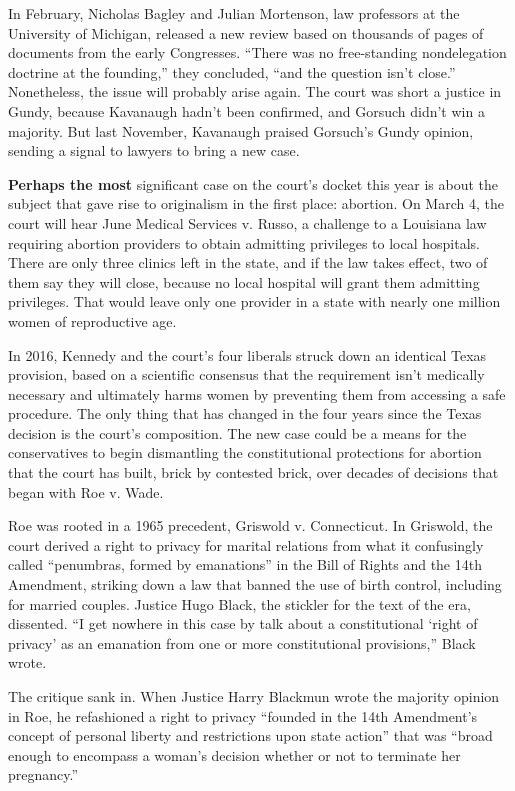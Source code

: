 In February, Nicholas Bagley and Julian Mortenson, law professors at the
University of Michigan, released a new review based on thousands of
pages of documents from the early Congresses. ``There was no
free-standing non­delegation doctrine at the founding,'' they concluded,
``and the question isn't close.'' Nonetheless, the issue will probably
arise again. The court was short a justice in Gundy, because Kavanaugh
hadn't been confirmed, and Gorsuch didn't win a majority. But last
November, Kavanaugh praised Gorsuch's Gundy opinion, sending a signal to
lawyers to bring a new case.

\textbf{Perhaps the most} significant case on the court's docket this
year is about the subject that gave rise to originalism in the first
place: abortion. On March 4, the court will hear June Medical Services
v. Russo, a challenge to a Louisiana law requiring abortion providers to
obtain admitting privileges to local hospitals. There are only three
clinics left in the state, and if the law takes effect, two of them say
they will close, because no local hospital will grant them admitting
privileges. That would leave only one provider in a state with nearly
one million women of reproductive age.

In 2016, Kennedy and the court's four liberals struck down an identical
Texas provision, based on a scientific consensus that the requirement
isn't medically necessary and ultimately harms women by preventing them
from accessing a safe procedure. The only thing that has changed in the
four years since the Texas decision is the court's composition. The new
case could be a means for the conservatives to begin dismantling the
constitutional protections for abortion that the court has built, brick
by contested brick, over decades of decisions that began with Roe v.
Wade.

Roe was rooted in a 1965 precedent, Griswold v. Connecticut. In
Griswold, the court derived a right to privacy for marital relations
from what it confusingly called ``penumbras, formed by emanations'' in
the Bill of Rights and the 14th Amendment, striking down a law that
banned the use of birth control, including for married couples. Justice
Hugo Black, the stickler for the text of the era, dissented. ``I get
nowhere in this case by talk about a constitutional `right of privacy'
as an emanation from one or more constitutional provisions,'' Black
wrote.

The critique sank in. When Justice Harry Blackmun wrote the majority
opinion in Roe, he refashioned a right to privacy ``founded in the 14th
Amendment's concept of personal liberty and restrictions upon state
action'' that was ``broad enough to encompass a woman's decision whether
or not to terminate her pregnancy.''

